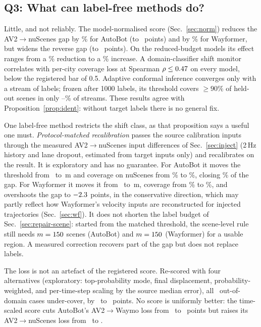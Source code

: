 \subsection{Q3: What can label-free methods do?}\label{sec:labelfree}
Little, and not reliably. The model-normalised score (Sec.~\ref{sec:norm}) reduces the AV2$\to$nuScenes gap by
\normReductionConf\% for AutoBot (to \gapNormConf\ points) and by \normReductionWf\% for Wayformer, but widens the
reverse gap (to \gapNormConfRev\ points). On the
reduced-budget models its effect ranges from a \explNormBestRed\% reduction to a \explNormWorstInc\% increase. A domain-classifier shift monitor
correlates with per-city coverage loss at Spearman $\rho\le0.47$ on every model, below the registered bar of 0.5.
Adaptive conformal inference \cite{gibbs2021adaptive} converges only with a stream of labels; frozen after 1000 labels,
its threshold covers $\ge90\%$ of held-out scenes in only \aciFrozenMin--\aciFrozenMax\% of streams. These results
agree with Proposition~\ref{prop:ident}: without target labels there is no general fix.

One label-free method restricts the shift class, as that proposition says a useful one must. \emph{Protocol-matched
recalibration} passes the source calibration inputs through the measured AV2$\to$nuScenes input differences of
Sec.~\ref{sec:inject} (2\,Hz history and lane dropout, estimated from target inputs only) and recalibrates on the
result. It is exploratory and has no guarantee. For AutoBot it moves the threshold from \mbQSrcAb\ to \mbQPmAb\,m
and coverage on nuScenes from \mbCovSrcAb\% to \mbCovPmAb\%, closing \mbClosedAb\% of the gap. For Wayformer it moves it
from \mbQSrcWf\ to \mbQPmWf\,m, coverage from \mbCovSrcWf\% to \mbCovPmWf\%, and overshoots the gap to
$-2.3$ points, in the conservative direction, which may partly reflect how Wayformer's velocity inputs are
reconstructed for injected trajectories (Sec.~\ref{sec:wf}). It does not shorten the label budget of Sec.~\ref{sec:repair-scene}:
started from the matched threshold, the scene-level rule still needs $m=150$ scenes (AutoBot) and $m=150$
(Wayformer) for a usable region. A measured correction recovers part of the gap but does not replace labels.

The loss is not an artefact of the registered score. Re-scored with four alternatives (exploratory: top-probability
mode, final displacement, probability-weighted, and per-time-step scaling by the source median error), all \scCells\
out-of-domain cases under-cover, by \scGapMin\ to \scGapMax\ points. No score is uniformly better: the time-scaled score cuts
AutoBot's AV2$\to$Waymo loss from \scRegWmAb\ to \scNormWmAb\ points but raises its AV2$\to$nuScenes loss from \scRegNsAb\
to \scNormNsAb.

